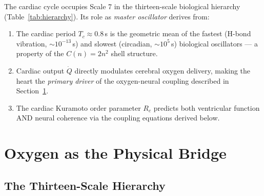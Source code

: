 \documentclass[12pt,a4paper]{article}
\theoremstyle{definition}
\begin{document}
The cardiac cycle occupies Scale 7 in the thirteen-scale biological hierarchy
(Table~\ref{tab:hierarchy}). Its role as \emph{master oscillator} derives from:

\begin{enumerate}
\item The cardiac period $T_c \approx 0.8$\,s is the geometric mean of the
  fastest (H-bond vibration, $\sim 10^{-13}$\,s) and slowest (circadian,
  $\sim 10^5$\,s) biological oscillators — a property of the $C(n) = 2n^2$
  shell structure.
\item Cardiac output $\dot{Q}$ directly modulates cerebral oxygen delivery,
  making the heart the \emph{primary driver} of the oxygen-neural coupling
  described in Section~\ref{sec:oxygen}.
\item The cardiac Kuramoto order parameter $R_c$ predicts both ventricular
  function AND neural coherence via the coupling equations derived below.
\end{enumerate}

\section{Oxygen as the Physical Bridge}
\label{sec:oxygen}

\subsection{The Thirteen-Scale Hierarchy}
\end{document}
